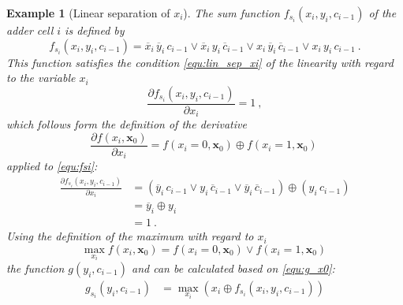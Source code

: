 \documentclass[a4paper]{article}
\newtheorem{example}{Example}
\newcommand\bx{\mathbf{x}}
\begin{document}
\begin{example}[Linear separation of $x_i$]
The sum function $f_{s_i}(x_i, y_i, c_{i-1})$ of the adder cell $i$ is defined by
\begin{equation}
f_{s_i}(x_i,y_i,c_{i-1}) = 
\overline{x}_i\, \overline{y}_i\, c_{i-1} \vee
\overline{x}_i\, y_i\, \overline{c}_{i-1} \vee
x_i\, \overline{y}_i\, \overline{c}_{i-1} \vee
x_i\, y_i\, c_{i-1} ~.
\label{equ:fsi}
\end{equation}
This function satisfies the condition \eqref{equ:lin_sep_xi} of the linearity with regard to the variable $x_i$
\begin{equation}
\frac{\partial f_{s_i}(x_i,y_i,c_{i-1}) }{\partial x_i} = 1~,
\label{equ:fsi_lin_xi}
\end{equation}
which follows form the definition of the derivative
\begin{equation}
\frac{\partial f(x_i,\bx_0)}{\partial x_i} = f(x_i=0,\bx_0) \oplus f(x_i=1,\bx_0)~
\label{equ:sder_def_xi}
\end{equation}
applied to \eqref{equ:fsi}:
\begin{align*}
	\frac{\partial f_{s_i}(x_i,y_i,c_{i-1}) }{\partial x_i} 
	&= 
(
\overline{y}_i\, c_{i-1} \vee
y_i\, \overline{c}_{i-1} \vee
\overline{y}_i\, \overline{c}_{i-1})
\oplus
(y_i\, c_{i-1})\\
	&= 
\overline{y}_i \oplus
y_i\, \\
	&= 1~.
\end{align*}
Using the definition of the maximum with regard to $x_i$
\begin{equation}
\max_{x_i} f(x_i,\bx_0) = f(x_i=0,\bx_0) \vee f(x_i=1,\bx_0)~
\label{equ:smax_def_xi}
\end{equation}
the function $g(y_i,c_{i-1})$ and can be calculated based on \eqref{equ:g_x0}:
\begin{align*}
	g_{s_i}(y_i,c_{i-1}) &= \max_{x_i} \left(x_i \oplus f_{s_i}(x_i,y_i,c_{i-1}) \right)\\

\end{align*}
\end{example}
\end{document}
